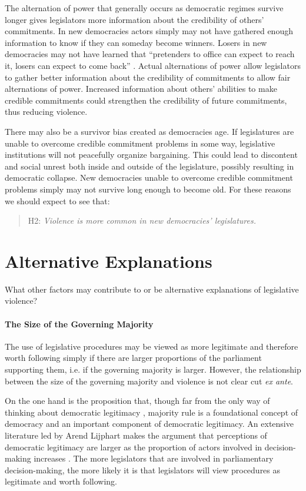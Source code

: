 \documentclass[a4paper]{article}\usepackage[]{graphicx}\usepackage[]{color}
\begin{document}
The alternation of power that generally occurs as democratic regimes survive longer gives legislators more information about the credibility of others' commitments. In new democracies actors simply may not have gathered enough information to know if they can someday become winners. Losers in new democracies may not have learned that ``pretenders to office can expect to reach it, losers can expect to come back'' \citep[][36]{Przeworski1991}. Actual alternations of power allow legislators to gather better information about the credibility of commitments to allow fair alternations of power. Increased information about others' abilities to make credible commitments could strengthen the credibility of future commitments, thus reducing violence.

There may also be a survivor bias created as democracies age. If legislatures are unable to overcome credible commitment problems in some way, legislative institutions will not peacefully organize bargaining. This could lead to discontent and social unrest both inside and outside of the legislature, possibly resulting in democratic collapse. New democracies unable to overcome credible commitment problems simply may not survive long enough to become old. For these reasons we should expect to see that:

\begin{quote}
    H2: \emph{Violence is more common in new democracies' legislatures.}
\end{quote}

\section*{Alternative Explanations}

What other factors may contribute to or be alternative explanations of legislative violence?

\paragraph{The Size of the Governing Majority}

The use of legislative procedures may be viewed as more legitimate and therefore worth following simply if there are larger proportions of the parliament supporting them, i.e. if the governing majority is larger. However, the relationship between the size of the governing majority and violence is not clear cut \emph{ex ante}.

On the one hand is the proposition that, though far from the only way of thinking about democratic legitimacy \cite{Follesdal2006}, majority rule is a foundational concept of democracy \citep{Dahl1989} and an important component of democratic legitimacy. An extensive literature led by Arend Lijphart makes the argument that perceptions of democratic legitimacy are larger as the proportion of actors involved in decision-making increases \citep[]{Lijphart2007}. The more legislators that are involved in parliamentary decision-making, the more likely it is that legislators will view procedures as legitimate and worth following.
\end{document}
